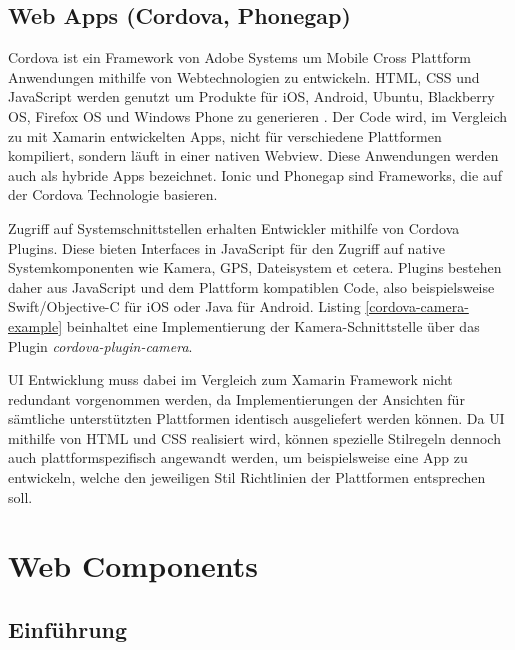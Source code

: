 \newpage


\subsection{Web Apps (Cordova, Phonegap)}

Cordova ist ein Framework von Adobe Systems um Mobile Cross Plattform Anwendungen mithilfe von Webtechnologien zu entwickeln.
\ac{HTML}, \ac{CSS} und JavaScript werden genutzt um Produkte für iOS, Android, Ubuntu, Blackberry OS, Firefox OS und Windows Phone zu generieren \cite{Cordo26:online}.
Der Code wird, im Vergleich zu mit Xamarin entwickelten Apps, nicht für verschiedene Plattformen kompiliert,
sondern läuft in einer nativen Webview. Diese Anwendungen werden auch als hybride Apps bezeichnet.
Ionic und Phonegap sind Frameworks, die auf der Cordova Technologie basieren.

Zugriff auf Systemschnittstellen erhalten Entwickler mithilfe von Cordova Plugins. Diese bieten
Interfaces in JavaScript für den Zugriff auf native Systemkomponenten wie Kamera, GPS, Dateisystem et cetera.
Plugins bestehen daher aus JavaScript und dem Plattform kompatiblen Code,
also beispielsweise Swift/Objective-C für iOS oder Java für Android.
Listing \ref{cordova-camera-example} beinhaltet eine Implementierung der Kamera-Schnittstelle über das Plugin \emph{cordova-plugin-camera}.

\ac{UI} Entwicklung muss dabei im Vergleich zum Xamarin Framework nicht redundant vorgenommen werden, da Implementierungen der
Ansichten für sämtliche unterstützten Plattformen identisch ausgeliefert werden können.
Da \ac{UI} mithilfe von \ac{HTML} und \ac{CSS} realisiert wird,
können spezielle Stilregeln dennoch auch plattformspezifisch angewandt werden, um beispielsweise eine App zu entwickeln,
welche den jeweiligen Stil Richtlinien der Plattformen entsprechen soll.

\vspace{0.3cm}

\vspace{0.3cm}

\newpage
\section{Web Components}


\subsection{Einführung}

